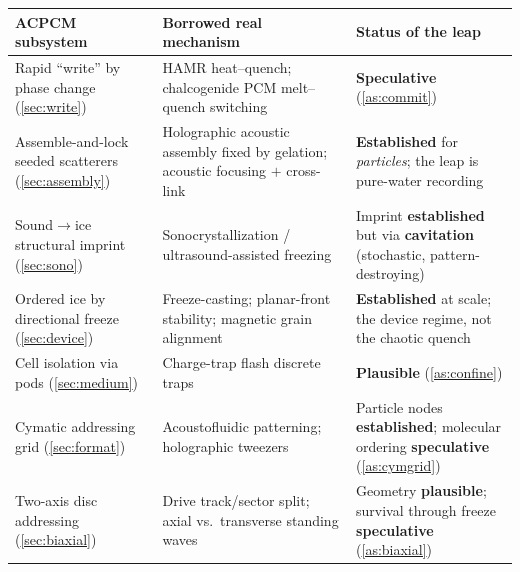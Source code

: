 \documentclass[11pt]{article}
\theoremstyle{definition}
\begin{document}
\begin{table}[!t]
\centering
\small
\renewcommand{\arraystretch}{1.25}
\begin{tabularx}{\textwidth}{@{}>{\raggedright\arraybackslash}p{}
  >{\raggedright\arraybackslash}X
  >{\raggedright\arraybackslash}p{}@{}}
\toprule
\textbf{ACPCM subsystem} & \textbf{Borrowed real mechanism} & \textbf{Status of the leap} \\
\midrule
Rapid ``write'' by phase change (\cref{sec:write})
  & HAMR heat--quench; chalcogenide PCM melt--quench switching~\cite{kryder2008hamr,wuttig2007pcm}
  & \textcolor{warnrule}{\bfseries Speculative} (\cref{as:commit}) \\
Assemble-and-lock seeded scatterers (\cref{sec:assembly})
  & Holographic acoustic assembly fixed by gelation; acoustic focusing $+$ cross-link~\cite{melde2023assembly,olofsson2021hydrogel}
  & \textcolor{acpcmteal}{\bfseries Established} for \emph{particles}; the leap is pure-water recording \\
Sound$\rightarrow$ice structural imprint (\cref{sec:sono})
  & Sonocrystallization / ultrasound-assisted freezing~\cite{zhang2021uafmech,delgado2017reviewcontrol}
  & Imprint \textcolor{acpcmteal}{\bfseries established} but via \textcolor{warnrule}{\bfseries cavitation} (stochastic, pattern-destroying) \\
Ordered ice by directional freeze (\cref{sec:device})
  & Freeze-casting; planar-front stability; magnetic grain alignment~\cite{deville2006freezecast,mullins1964stability,porter2012magnetic}
  & \textcolor{acpcmteal}{\bfseries Established} at scale; the device regime, not the chaotic quench \\
Cell isolation via pods (\cref{sec:medium})
  & Charge-trap flash discrete traps~\cite{white2000sonos}
  & \textcolor{acpcmgray}{\bfseries Plausible} (\cref{as:confine}) \\
Cymatic addressing grid (\cref{sec:format})
  & Acoustofluidic patterning; holographic tweezers~\cite{rufo2022acoustofluidics,marzo2015holographic}
  & Particle nodes \textcolor{acpcmteal}{\bfseries established}; molecular ordering \textcolor{warnrule}{\bfseries speculative} (\cref{as:cymgrid}) \\
Two-axis disc addressing (\cref{sec:biaxial})
  & Drive track/sector split; axial vs.\ transverse standing waves
  & Geometry \textcolor{acpcmgray}{\bfseries plausible}; survival through freeze \textcolor{warnrule}{\bfseries speculative} (\cref{as:biaxial}) \\

\end{tabularx}
\end{table}
\end{document}
